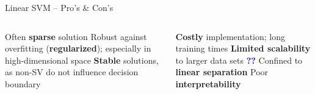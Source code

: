 
\setdraft

\begin{frame}{Linear SVM -- Pro's \& Con's}

\begin{columns}[onlytextwidth]
  \begin{column}{0.5\textwidth}
    \footnotesize
    \begin{itemize}
      \positem Often \textbf{sparse} solution
      \positem Robust against overfitting (\textbf{regularized}); especially in 
      high-dimensional space
      \positem \textbf{Stable} solutions, as non-SV do not influence decision 
      boundary
    \end{itemize}
  \end{column}

  \begin{column}{0.5\textwidth}
    \footnotesize
    \begin{itemize}
      \negitem \textbf{Costly} implementation; long training times
      \negitem \textbf{Limited scalability} to larger data sets 
      \textcolor{blue}{\textbf{??}}
      \negitem Confined to \textbf{linear separation}
      \negitem Poor \textbf{interpretability}
    \end{itemize}
  \end{column}
\end{columns}

\vfill

\small


\end{frame}

\undraft


